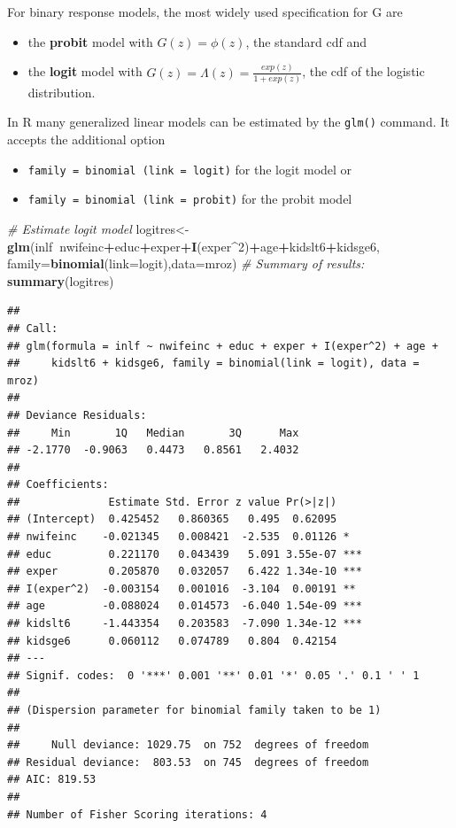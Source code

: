 \documentclass[]{book}
\newenvironment{Shaded}{\begin{snugshade}}{\end{snugshade}}
\newcommand{\CommentTok}[1]{\textcolor[rgb]{0.56,0.35,0.01}{\textit{#1}}}
\newcommand{\DataTypeTok}[1]{\textcolor[rgb]{0.13,0.29,0.53}{#1}}
\newcommand{\DecValTok}[1]{\textcolor[rgb]{0.00,0.00,0.81}{#1}}
\newcommand{\KeywordTok}[1]{\textcolor[rgb]{0.13,0.29,0.53}{\textbf{#1}}}
\newcommand{\NormalTok}[1]{#1}
\newcommand{\OperatorTok}[1]{\textcolor[rgb]{0.81,0.36,0.00}{\textbf{#1}}}
\providecommand{\tightlist}{%
  \setlength{\itemsep}{0pt}\setlength{\parskip}{0pt}}
\begin{document}
For binary response models, the most widely used specification for G are

\begin{itemize}
\tightlist
\item
  the \textbf{probit} model with \(G(z) = \phi(z)\), the standard cdf
  and
\item
  the \textbf{logit} model with
  \(G(z) = \Lambda(z) = \frac{exp(z)}{1+ exp(z)}\), the cdf of the
  logistic distribution.
\end{itemize}

In R many generalized linear models can be estimated by the
\texttt{glm()} command. It accepts the additional option

\begin{itemize}
\tightlist
\item
  \texttt{family\ =\ binomial\ (link\ =\ logit)} for the logit model or
\item
  \texttt{family\ =\ binomial\ (link\ =\ probit)} for the probit model
\end{itemize}

\begin{Shaded}
\begin{Highlighting}[]
\CommentTok{# Estimate logit model}
\NormalTok{logitres<-}\KeywordTok{glm}\NormalTok{(inlf}\OperatorTok{~}\NormalTok{nwifeinc}\OperatorTok{+}\NormalTok{educ}\OperatorTok{+}\NormalTok{exper}\OperatorTok{+}\KeywordTok{I}\NormalTok{(exper}\OperatorTok{^}\DecValTok{2}\NormalTok{)}\OperatorTok{+}\NormalTok{age}\OperatorTok{+}\NormalTok{kidslt6}\OperatorTok{+}\NormalTok{kidsge6,}
              \DataTypeTok{family=}\KeywordTok{binomial}\NormalTok{(}\DataTypeTok{link=}\NormalTok{logit),}\DataTypeTok{data=}\NormalTok{mroz)}
\CommentTok{# Summary of results:}
\KeywordTok{summary}\NormalTok{(logitres)}
\end{Highlighting}
\end{Shaded}

\begin{verbatim}
## 
## Call:
## glm(formula = inlf ~ nwifeinc + educ + exper + I(exper^2) + age + 
##     kidslt6 + kidsge6, family = binomial(link = logit), data = mroz)
## 
## Deviance Residuals: 
##     Min       1Q   Median       3Q      Max  
## -2.1770  -0.9063   0.4473   0.8561   2.4032  
## 
## Coefficients:
##              Estimate Std. Error z value Pr(>|z|)    
## (Intercept)  0.425452   0.860365   0.495  0.62095    
## nwifeinc    -0.021345   0.008421  -2.535  0.01126 *  
## educ         0.221170   0.043439   5.091 3.55e-07 ***
## exper        0.205870   0.032057   6.422 1.34e-10 ***
## I(exper^2)  -0.003154   0.001016  -3.104  0.00191 ** 
## age         -0.088024   0.014573  -6.040 1.54e-09 ***
## kidslt6     -1.443354   0.203583  -7.090 1.34e-12 ***
## kidsge6      0.060112   0.074789   0.804  0.42154    
## ---
## Signif. codes:  0 '***' 0.001 '**' 0.01 '*' 0.05 '.' 0.1 ' ' 1
## 
## (Dispersion parameter for binomial family taken to be 1)
## 
##     Null deviance: 1029.75  on 752  degrees of freedom
## Residual deviance:  803.53  on 745  degrees of freedom
## AIC: 819.53
## 
## Number of Fisher Scoring iterations: 4
\end{verbatim}
\end{document}

